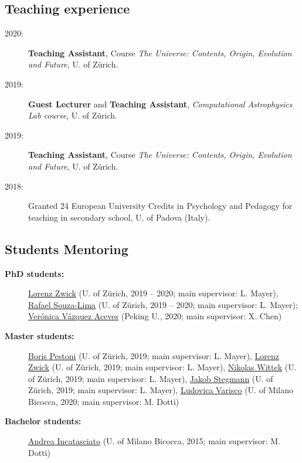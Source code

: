 \subsection*{Teaching experience}

\begin{description}

    \item[2020:] 
    \textbf{Teaching Assistant}, Course \textit{The Universe: Contents, Origin, Evolution and Future}, U. of Z\"urich.
    
    \item[2019:] \textbf{Guest Lecturer} and \textbf{Teaching Assistant},   \textit{Computational Astrophysics Lab course}, U. of Z\"urich. %

    \item[2019:] 
    \textbf{Teaching Assistant}, Course \textit{The Universe: Contents, Origin, Evolution and Future}, U. of Z\"urich.

    \item[2018:] Granted 24 European University Credits in Psychology and Pedagogy for teaching in secondary school, U. of Padova (Italy).
\end{description}

\subsection*{Students Mentoring}

\begin{description}

    
    \item[\bf PhD students:] \underline{Lorenz Zwick} (U. of Z\"urich, 2019 -- 2020; main supervisor: L. Mayer), \underline{Rafael Souza-Lima} (U. of Z\"urich, 2019 -- 2020; main supervisor: L. Mayer); \underline{Verónica Vázquez Aceves} (Peking U., 2020; main supervisor: X. Chen)

    \item[\bf Master students:] \underline{Boris Pestoni} (U. of Z\"urich, 2019; main supervisor: L. Mayer), \underline{Lorenz Zwick} (U. of Z\"urich, 2019; main supervisor: L. Mayer), \underline{Nikolas Wittek} (U. of Z\"urich, 2019; main supervisor: L. Mayer), \underline{Jakob Stegmann} (U. of Z\"urich, 2019; main supervisor: L. Mayer), \underline{Ludovica Varisco} (U. of Milano Bicocca, 2020; main supervisor: M. Dotti)
    
    \item[\bf Bachelor students:]  \underline{Andrea Incatasciato} (U. of Milano Bicocca, 2015; main supervisor: M. Dotti)


\end{description}

